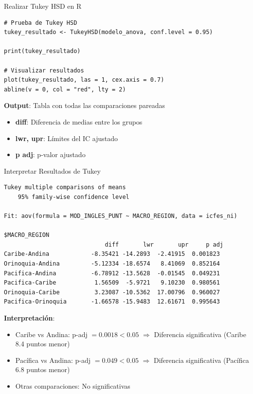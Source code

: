 \documentclass[aspectratio=169, 11pt]{beamer}
\begin{document}
\begin{frame}[fragile]{Realizar Tukey HSD en R}
\begin{lstlisting}
# Prueba de Tukey HSD
tukey_resultado <- TukeyHSD(modelo_anova, conf.level = 0.95)

print(tukey_resultado)

# Visualizar resultados
plot(tukey_resultado, las = 1, cex.axis = 0.7)
abline(v = 0, col = "red", lty = 2)
\end{lstlisting}

\vspace{0.3cm}
\textbf{Output}: Tabla con todas las comparaciones pareadas
\begin{itemize}
  \item \textbf{diff}: Diferencia de medias entre los grupos
  \item \textbf{lwr, upr}: Límites del IC ajustado
  \item \textbf{p adj}: p-valor ajustado
\end{itemize}
\end{frame}

\begin{frame}[fragile]{Interpretar Resultados de Tukey}
\begin{lstlisting}[basicstyle=\ttfamily\tiny]
  Tukey multiple comparisons of means
    95% family-wise confidence level

Fit: aov(formula = MOD_INGLES_PUNT ~ MACRO_REGION, data = icfes_ni)

$MACRO_REGION
                             diff       lwr       upr     p adj
Caribe-Andina            -8.35421 -14.2893  -2.41915  0.001823
Orinoquia-Andina         -5.12334 -18.6574   8.41069  0.852164
Pacifica-Andina          -6.78912 -13.5628  -0.01545  0.049231
Pacifica-Caribe           1.56509  -5.9721   9.10230  0.980561
Orinoquia-Caribe          3.23087 -10.5362  17.00796  0.960027
Pacifica-Orinoquia       -1.66578 -15.9483  12.61671  0.995643
\end{lstlisting}

\vspace{0.3cm}
\textbf{Interpretación}:
\begin{itemize}
  \item Caribe vs Andina: p-adj $= 0.0018 < 0.05$ $\Rightarrow$ \alert{Diferencia significativa} (Caribe 8.4 puntos menor)
  \item Pacífica vs Andina: p-adj $= 0.049 < 0.05$ $\Rightarrow$ \alert{Diferencia significativa} (Pacífica 6.8 puntos menor)
  \item Otras comparaciones: No significativas
\end{itemize}
\end{frame}
\end{document}
